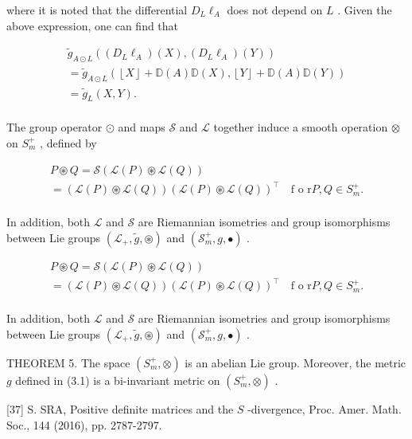 \documentclass[11pt]{article}
\begin{document}
where it is noted that the differential  $D_{L}\ell_{A}$  does not depend on  $L$ . Given the above expression, one can find that

$$
\begin{array}{l} \tilde {g} _ {A \odot L} ((D _ {L} \ell_ {A}) (X), (D _ {L} \ell_ {A}) (Y)) \\ = \tilde {g} _ {A \odot L} (\left\lfloor X \right\rfloor + \mathbb {D} (A) \mathbb {D} (X), \left\lfloor Y \right\rfloor + \mathbb {D} (A) \mathbb {D} (Y)) \\ = \tilde {g} _ {L} (X, Y). \\ \end{array}
$$

The group operator  $\odot$  and maps  $\mathcal{S}$  and  $\mathcal{L}$  together induce a smooth operation  $\otimes$  on  $S_{m}^{+}$ , defined by

$$
\begin{array}{l} P \circledast Q = \mathcal {S} (\mathcal {L} (P) \circledast \mathcal {L} (Q)) \\ = \left(\mathcal {L} (P) \circledast \mathcal {L} (Q)\right) \left(\mathcal {L} (P) \circledast \mathcal {L} (Q)\right) ^ {\top} \quad \text {f o r} P, Q \in S _ {m} ^ {+}. \\ \end{array}
$$

In addition, both  $\mathcal{L}$  and  $\mathcal{S}$  are Riemannian isometries and group isomorphisms between Lie groups  $(\mathcal{L}_{+},\tilde{g},\circledast)$  and  $(\mathcal{S}_m^+,g,\bullet)$ .

$$
\begin{array}{l} P \circledast Q = \mathcal {S} (\mathcal {L} (P) \circledast \mathcal {L} (Q)) \\ = \left(\mathcal {L} (P) \circledast \mathcal {L} (Q)\right) \left(\mathcal {L} (P) \circledast \mathcal {L} (Q)\right) ^ {\top} \quad \text {f o r} P, Q \in S _ {m} ^ {+}. \\ \end{array}
$$

In addition, both  $\mathcal{L}$  and  $\mathcal{S}$  are Riemannian isometries and group isomorphisms between Lie groups  $(\mathcal{L}_{+},\tilde{g},\circledast)$  and  $(\mathcal{S}_m^+,g,\bullet)$ .

THEOREM 5. The space  $(S_m^+, \otimes)$  is an abelian Lie group. Moreover, the metric  $g$  defined in (3.1) is a bi-invariant metric on  $(S_m^+, \otimes)$ .

[37] S. SRA, Positive definite matrices and the  $S$ -divergence, Proc. Amer. Math. Soc., 144 (2016), pp. 2787-2797.
\end{document}

